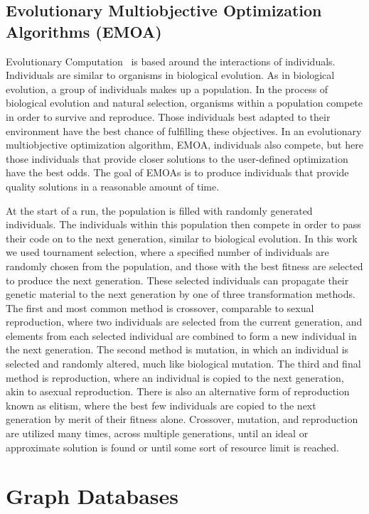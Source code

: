 \documentclass[12pt]{article}
\begin{document}
\subsection{Evolutionary Multiobjective Optimization Algorithms (EMOA)}
\label{sec:EMOA}

Evolutionary Computation~\cite{poli08:fieldguide} is based around the interactions of individuals. Individuals are similar to organisms in biological evolution. As in biological evolution, a group of individuals makes up a population. In the process of biological evolution and natural selection, organisms within a population compete in order to survive and reproduce. Those individuals best adapted to their environment have the best chance of fulfilling these objectives.  In an evolutionary multiobjective optimization algorithm, EMOA, individuals also compete, but here those individuals that provide closer solutions to the user-defined optimization have the best odds. The goal of EMOAs is to produce individuals that provide quality solutions in a reasonable amount of time. 

At the start of a run, the population is filled with randomly generated individuals. The individuals within this population then compete in order to pass their code on to the next generation, similar to biological evolution. In this work we used tournament selection, where a specified number of individuals are randomly chosen from the population, and those with the best fitness are selected to produce the next generation. These selected individuals can propagate their genetic material to the next generation by one of three transformation methods. The first and most common method is crossover, comparable to sexual reproduction, where two individuals are selected from the current generation, and elements from each selected individual are combined to form a new individual in the next generation. The second method is mutation, in which an individual is selected and randomly altered, much like biological mutation. The third and final method is reproduction, where an individual is copied to the next generation, akin to asexual reproduction. There is also an alternative form of reproduction known as elitism, where the best few individuals are copied to the next generation by merit of their fitness alone. Crossover, mutation, and reproduction are utilized many times, across multiple generations, until an ideal or approximate solution is found or until some sort of resource limit is reached.

\section{Graph Databases}
\label{sec:Graph Databases}
\end{document}
